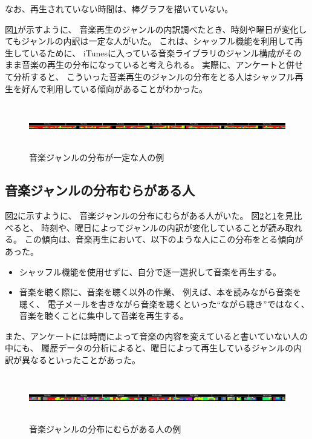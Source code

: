 \documentclass[11pt, onecolumn]{jsarticle}
\begin{document}
なお、再生されていない時間は、棒グラフを描いていない。

図\ref{genreMap_regular}が示すように、
音楽再生のジャンルの内訳調べたとき、時刻や曜日が変化してもジャンルの内訳は一定な人がいた。
これは、シャッフル機能を利用して再生しているために、
iTunesに入っている音楽ライブラリのジャンル構成がそのまま音楽の再生の分布になっていると考えられる。
実際に、アンケートと併せて分析すると、
こういった音楽再生のジャンルの分布をとる人はシャッフル再生を好んで利用している傾向があることがわかった。

\begin{figure}[h]
\begin{center}
\includegraphics[width=14cm,height=2cm]{genreMap_regular.jpg}
\caption{音楽ジャンルの分布が一定な人の例}
\label{genreMap_regular}
\end{center}
\end{figure}

\subsection{音楽ジャンルの分布むらがある人}
図\ref{genreMap_irregular}に示すように、
音楽ジャンルの分布にむらがある人がいた。
図\ref{genreMap_irregular}と\ref{genreMap_regular}を見比べると、
時刻や、曜日によってジャンルの内訳が変化していることが読み取れる。
この傾向は、音楽再生において、以下のような人にこの分布をとる傾向があった。
\begin{itemize}
\item
シャッフル機能を使用せずに、自分で逐一選択して音楽を再生する。
\item
音楽を聴く際に、音楽を聴く以外の作業、
例えば、本を読みながら音楽を聴く、
電子メールを書きながら音楽を聴くといった``ながら聴き''ではなく、
音楽を聴くことに集中して音楽を再生する。
\end{itemize}
また、アンケートには時間によって音楽の内容を変えていると書いていない人の中にも、
履歴データの分析によると、曜日によって再生しているジャンルの内訳が異なるといったことがあった。


\begin{figure}[h]
\begin{center}
\includegraphics[width=14cm, height = 2cm]{genreMap_irregular.jpg}
\caption{音楽ジャンルの分布にむらがある人の例}
\label{genreMap_irregular}
\end{center}
\end{figure}
\end{document}
